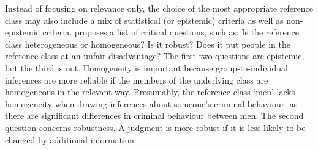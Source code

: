 \documentclass{article}
\begin{document}
Instead of focusing on relevance only, the choice of the most appropriate reference class may also include a mix of statistical (or epistemic) criteria as well as non-epistemic criteria. \citet{dahlman2017unacceptable} proposes a list of critical questions, such as:
Is the reference class heterogeneous or homogeneous? Is it robust? Does it put people in the reference class at an unfair disadvantage?
The first two questions are epistemic, but the third is not. Homogeneity is important because group-to-individual inferences are more reliable if the members of the underlying class are homogeneous in the relevant way. Presumably, the reference class `men'  lacks homogeneity when drawing inferences about someone's criminal behaviour, as there are significant differences in criminal behaviour between men. %
The second question concerns robustness. 
A judgment is more robust if it is less likely to be changed by additional information. 
\end{document}
